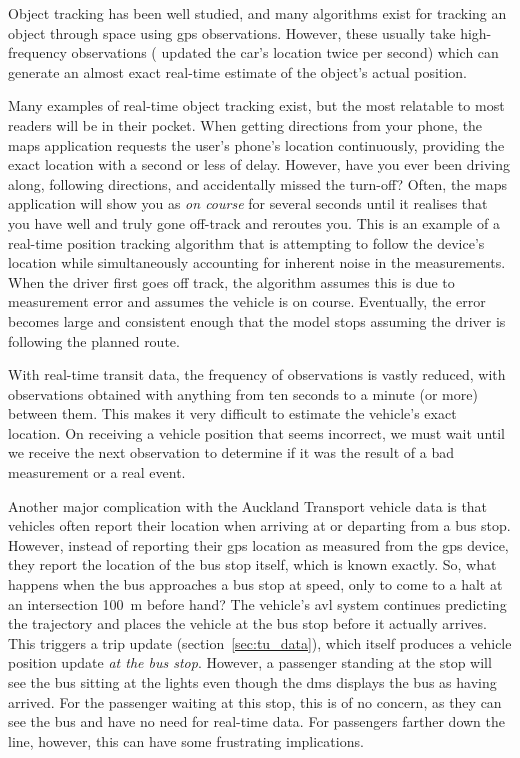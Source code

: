 Object tracking has been well studied, and many algorithms exist for tracking an object through space using \gls{gps} observations. However, these usually take high-frequency observations (\citet{Gustafsson_2002} updated the car's location twice per second) which can generate an almost exact real-time estimate of the object's actual position.


Many examples of real-time object tracking exist, but the most relatable to most readers will be in their pocket. When getting directions from your phone, the maps application requests the user's phone's location continuously, providing the exact location with a second or less of delay. However, have you ever been driving along, following directions, and accidentally missed the turn-off? Often, the maps application will show you as \emph{on course} for several seconds until it realises that you have well and truly gone off-track and reroutes you. This is an example of a real-time position tracking algorithm that is attempting to follow the device's location while simultaneously accounting for inherent noise in the measurements. When the driver first goes off track, the algorithm assumes this is due to measurement error and assumes the vehicle is on course. Eventually, the error becomes large and consistent enough that the model stops assuming the driver is following the planned route.


With real-time transit data, the frequency of observations is vastly reduced, with observations obtained with anything from ten seconds to a minute (or more) between them. This makes it very difficult to estimate the vehicle's exact location. On receiving a vehicle position that seems incorrect, we must wait until we receive the next observation to determine if it was the result of a bad measurement or a real event.


Another major complication with the Auckland Transport vehicle data is that vehicles often report their location when arriving at or departing from a bus stop. However, instead of reporting their \gls{gps} location as measured from the \gls{gps} device, they report the location of the bus stop itself, which is known exactly. So, what happens when the bus approaches a bus stop at speed, only to come to a halt at an intersection 100~m before hand? The vehicle's \gls{avl} system continues predicting the trajectory and places the vehicle at the bus stop before it actually arrives. This triggers a trip update (section~\ref{sec:tu_data}), which itself produces a vehicle position update \emph{at the bus stop}. However, a passenger standing at the stop will see the bus sitting at the lights even though the \gls{dms} displays the bus as having arrived. For the passenger waiting at this stop, this is of no concern, as they can see the bus and have no need for real-time data. For passengers farther down the line, however, this can have some frustrating implications.


